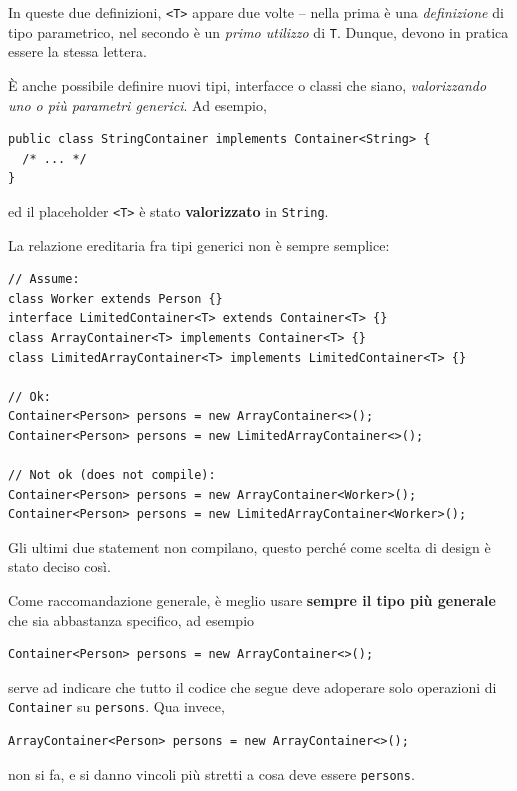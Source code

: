 \documentclass[\fontsizeclass,twocolumn]{\classname}
\theoremstyle{definition}
\theoremstyle{definition}
\begin{document}
In queste due definizioni, \texttt{<T>} appare due volte -- nella prima è una
\emph{definizione} di tipo parametrico, nel secondo è un \emph{primo utilizzo}
di \texttt{T}. Dunque, devono in pratica essere la stessa lettera.

È anche possibile definire nuovi tipi, interfacce o classi che siano, \emph{valorizzando uno o più parametri generici}. Ad esempio,

\begin{lstlisting}
public class StringContainer implements Container<String> {
  /* ... */
}
\end{lstlisting}

ed il placeholder \texttt{<T>} è stato \textbf{valorizzato} in \texttt{String}.

La relazione ereditaria fra tipi generici non è sempre semplice:

\begin{lstlisting}
// Assume:
class Worker extends Person {}
interface LimitedContainer<T> extends Container<T> {}
class ArrayContainer<T> implements Container<T> {}
class LimitedArrayContainer<T> implements LimitedContainer<T> {}

// Ok:
Container<Person> persons = new ArrayContainer<>();
Container<Person> persons = new LimitedArrayContainer<>();

// Not ok (does not compile):
Container<Person> persons = new ArrayContainer<Worker>();
Container<Person> persons = new LimitedArrayContainer<Worker>();
\end{lstlisting}

Gli ultimi due statement non compilano, questo perché come scelta di design è
stato deciso così.

Come raccomandazione generale, è meglio usare \textbf{sempre il tipo più
generale} che sia abbastanza specifico, ad esempio

\begin{lstlisting}
Container<Person> persons = new ArrayContainer<>();
\end{lstlisting}

serve ad indicare che tutto il codice che segue deve adoperare solo operazioni
di \texttt{Container} su \texttt{persons}. Qua invece, 

\begin{lstlisting}
ArrayContainer<Person> persons = new ArrayContainer<>();
\end{lstlisting}

non si fa, e si danno vincoli più stretti a cosa deve essere \texttt{persons}.
\end{document}
